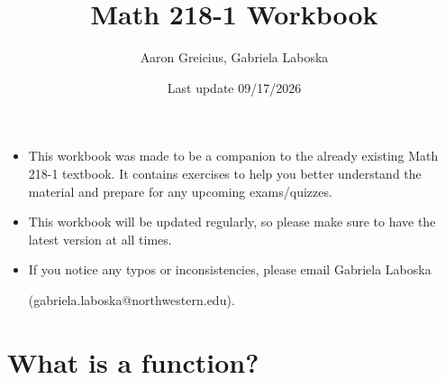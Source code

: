 \documentclass[12pt]{article}
\title{Math 218-1 Workbook}
\author{Aaron Greicius, Gabriela Laboska}
\date{Last update 09/17/2026}
\begin{document}
	
	\maketitle
	\vspace{2cm}
	\begin{itemize}
		\item This workbook was made to be a companion to the already existing Math 218-1 textbook. It contains exercises to help you better understand the material and prepare for any upcoming exams/quizzes.
		\item This workbook will be updated regularly, so please make sure to have the latest version at all times.
		\item If you notice any typos or inconsistencies, please email Gabriela Laboska 
		
		(gabriela.laboska@northwestern.edu).
	\end{itemize}
	
	\newpage
	
	\tableofcontents
	\newpage
	
	\section{What is a function?}
	
\end{document}
